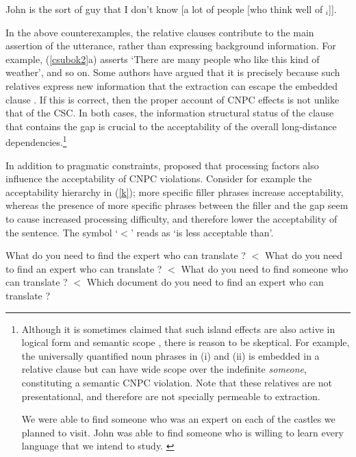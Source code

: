 \documentclass[output=paper
 	        ,biblatex
                ,babelshorthands
                ,newtxmath
                ,draftmode
                ,colorlinks, citecolor=brown
]{langscibook}
\begin{document}
\ex John is the sort of guy that I don't know [a lot of people [who think well of
\spc$_i$]].\\
\citep[230]{culicover99}
\zl

In the above counterexamples, the relative clauses contribute to the main assertion of the utterance, rather than expressing background information. For example, (\ref{csubok2}a) asserts `There are many people who like this kind of weather', and so on.
Some authors have argued that it is precisely because such relatives
express new information that the extraction can escape the embedded clause
  \citep{shirlappin,kuno87,Dean,goldberg13}.  If this is correct, then the proper 
  account of CNPC effects is not unlike that of the CSC. In both cases, 
  the information structural status of the clause that contains the gap is crucial
  to the acceptability of the overall long-distance dependencies.\footnote{Although it is sometimes claimed
   that
such  island effects are also active in logical form and semantic scope \citep{may85,ruys,fox,sab,katzira}, 
  there is reason to be skeptical.  For example, the universally quantified noun phrases  in (i) and (ii)  is embedded in a relative clause but can have wide scope over the indefinite \emph{someone}, constituting a semantic CNPC violation. Note that these relatives are not presentational, and therefore are not specially permeable to extraction.

\eal
\ex  We were able to find someone who was an expert on each of the
     castles we planned to visit.  \citep[304]{MRS}
\ex John was able to find someone  who is willing to learn every  language
    that we intend to study. \citep{chavesrnr}
\zllast}

 
 
  
In addition to pragmatic constraints,  \citet{kluender92,kluender}  proposed that 
processing factors also  influence the acceptability of    CNPC violations.
Consider for example the acceptability hierarchy in  (\ref{k});  more specific filler phrases increase acceptability, whereas    the presence of more specific phrases between the filler and the gap seem  to cause increased processing difficulty, and therefore   lower the acceptability of the sentence.  The symbol `$<$' reads as `is less acceptable than'.

\eal \label{k}
\ex What do you need to find the expert who can translate \spc?  $<$
\ex What do you need to find an expert who can translate \spc?   $<$
\ex What do you need to find someone who can translate \spc? $<$
\ex Which document do you need to find an expert who can translate \spc?
\zl
\end{document}

